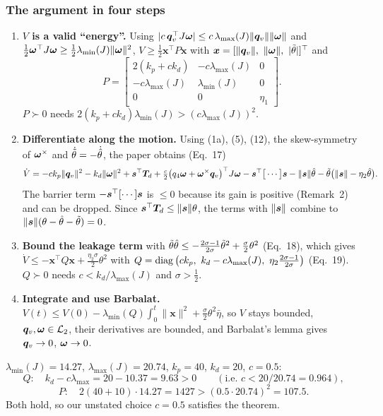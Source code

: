 \subsubsection*{The argument in four steps}
\begin{enumerate}[leftmargin=*]
  \item \textbf{$V$ is a valid ``energy''.} Using $|c\,\bm{q}_v^\top J\bm{\omega}|\le c\,\lambda_{\max}(J)\|\bm{q}_v\|\|\bm{\omega}\|$ and
        $\tfrac12\bm{\omega}^\top J\bm{\omega}\ge\tfrac12\lambda_{\min}(J)\|\bm{\omega}\|^2$, $V\ge\tfrac12\bm x^\top P\bm x$ with
        $\bm x=[\|\qv\|,\ \|\vw\|,\ |\ttil|]^\top$ and
        \[
        P=\begin{bmatrix}2(k_p+ck_d)&-c\lambda_{\max}(J)&0\\-c\lambda_{\max}(J)&\lambda_{\min}(J)&0\\0&0&\eta_1\end{bmatrix}.
        \]
        $P\succ0$ needs $2(k_p+ck_d)\lambda_{\min}(J)>(c\lambda_{\max}(J))^2$.
  \item \textbf{Differentiate along the motion.} Using (1a), (5), (12), the skew-symmetry of $\bm{\omega}^\times$ and $\dot{\tilde{\theta}}=-\dot{\hat{\theta}}$,
        the paper obtains (Eq.~17)
        \[
        \dot V=-ck_p\|\bm{q}_v\|^2-k_d\|\bm{\omega}\|^2+\bm{s}^\top\bm T_d+\tfrac c2\big(q_4\bm{\omega}+\bm{\omega}^\times\bm{q}_v\big)^\top J\bm{\omega}
        -\bm{s}^\top\big[\cdots\big]\bm{s}-\|\bm{s}\|\hat{\theta}-\tilde{\theta}\big(\|\bm{s}\|-\eta_2\hat{\theta}\big).
        \]
        The barrier term $-\bm{s}^\top[\cdots]\bm{s}$ is $\le0$ because its gain is positive (Remark~2) and can be dropped.
        Since $\bm{s}^\top\bm T_d\le\|\bm{s}\|\theta$, the terms with $\|\bm{s}\|$ combine to $\|\bm{s}\|(\theta-\hat{\theta}-\tilde{\theta})=0$.
  \item \textbf{Bound the leakage term} with $\tilde{\theta}\hat{\theta}\le-\tfrac{2\sigma-1}{2\sigma}\tilde{\theta}^2+\tfrac{\sigma}{2}\theta^2$ (Eq.~18),
        which gives $\dot V\le-\bm x^\top Q\bm x+\tfrac{\eta_2\sigma}{2}\theta^2$ with
        $Q=\diag\big(ck_p,\ k_d-c\lambda_{\max}(J),\ \eta_2\tfrac{2\sigma-1}{2\sigma}\big)$ (Eq.~19). $Q\succ0$ needs
        $c<k_d/\lambda_{\max}(J)$ and $\sigma>\tfrac12$.
  \item \textbf{Integrate and use Barbalat.} $V(t)\le V(0)-\lambda_{\min}(Q)\int_0^t\|\bm x\|^2+\tfrac{\sigma}{2}\theta^2\bar\eta$,
        so $V$ stays bounded, $\bm{q}_v,\bm{\omega}\in\mathcal L_2$, their derivatives are bounded, and Barbalat's lemma gives
        $\bm{q}_v\to0$, $\bm{\omega}\to0$.
\end{enumerate}

\begin{toybox}
$\lambda_{\min}(J)=14.27$, $\lambda_{\max}(J)=20.74$, $k_p=40$, $k_d=20$, $c=0.5$:
\[
Q:\quad k_d-c\lambda_{\max}=20-10.37=9.63>0\qquad(\text{i.e. } c<20/20.74=0.964),
\]
\[
P:\quad 2(40+10)\cdot14.27=1427>(0.5\cdot20.74)^2=107.5 .
\]
Both hold, so our unstated choice $c=0.5$ satisfies the theorem.
\end{toybox}

